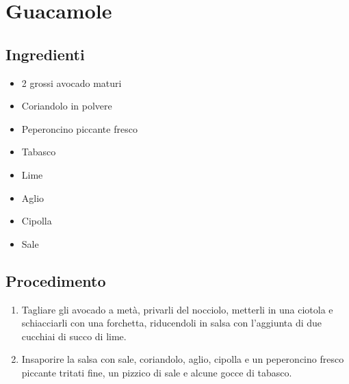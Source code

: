 \section{Guacamole}
\subsection{Ingredienti}
\begin{itemize}
\item 2 grossi avocado maturi  
\item Coriandolo in polvere  
\item Peperoncino piccante fresco  
\item Tabasco  
\item Lime  
\item Aglio  
\item Cipolla  
\item Sale
\end{itemize}
\subsection{Procedimento}
\begin{enumerate}
\item  Tagliare gli avocado a metà, privarli del nocciolo, metterli in una ciotola e schiacciarli con una forchetta, riducendoli in salsa con l'aggiunta di due cucchiai di succo di lime.  
\item  Insaporire la salsa con sale, coriandolo, aglio, cipolla e un peperoncino fresco piccante tritati fine, un pizzico di sale e alcune gocce di tabasco.
\end{enumerate}
